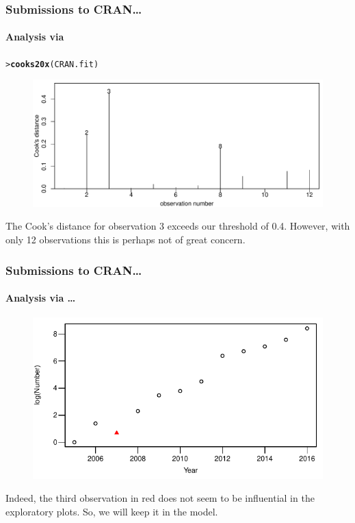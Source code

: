 \documentclass{beamer}\usepackage[]{graphicx}\usepackage[]{xcolor}
\makeatletter
\newcommand{\hlstd}[1]{\textcolor[rgb]{0.345,0.345,0.345}{#1}}%
\newcommand{\hlkwd}[1]{\textcolor[rgb]{0.737,0.353,0.396}{\textbf{#1}}}%
\newenvironment{kframe}{%
 \def\at@end@of@kframe{}%
 \ifinner\ifhmode%
  \def\at@end@of@kframe{\end{minipage}}%
  \begin{minipage}{\columnwidth}%
 \fi\fi%
 \def\FrameCommand##1{\hskip\@totalleftmargin \hskip-\fboxsep
 \colorbox{shadecolor}{##1}\hskip-\fboxsep
     \hskip-\linewidth \hskip-\@totalleftmargin \hskip\columnwidth}%
 \MakeFramed {\advance\hsize-\width
   \@totalleftmargin\z@ \linewidth\hsize
   \@setminipage}}%
 {\par\unskip\endMakeFramed%
 \at@end@of@kframe}
\newenvironment{knitrout}{}{} %
\makeatother
\begin{document}
\begin{frame}[fragile]
\frametitle{Submissions to CRAN\ldots}
\framesubtitle{Analysis via }
\label{pg:LMcooks20x}

\begin{knitrout}\scriptsize
{}\color{fgcolor}\begin{kframe}
\begin{alltt}
\hlstd{> }\hlkwd{cooks20x}\hlstd{(CRAN.fit)}
\end{alltt}
\end{kframe}
\end{knitrout}



\begin{figure}
  \centering
  \includegraphics[scale = 0.5]{figure/RC-H13-005b}
\end{figure}

The Cook's distance for observation 3 exceeds our threshold of 0.4. However, with only 12 observations this is perhaps not of great concern.
\end{frame}



\begin{frame}[fragile]
\frametitle{Submissions to CRAN\ldots}
\framesubtitle{Analysis via \ldots}



\begin{figure}
  \centering
  \includegraphics{figure/RC-H13-006}
\end{figure}

Indeed, the third observation in {\color{red}red} does not seem to be influential in the exploratory plots. So, we will keep it in the model.
\end{frame}
\end{document}
